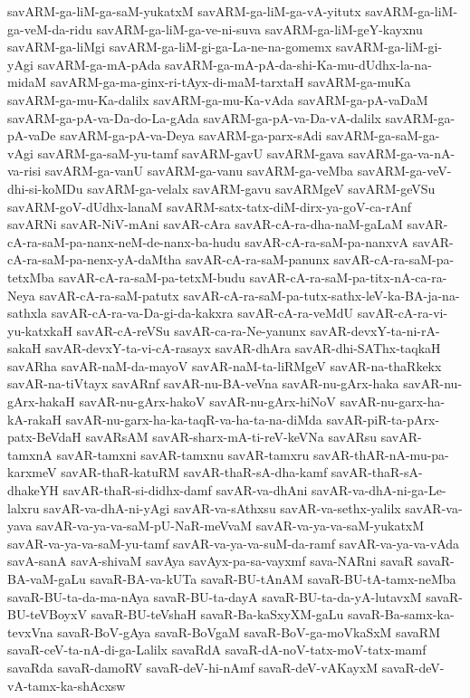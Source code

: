 {savARM-ga-liM-ga-saM-yukatxM
savARM-ga-liM-ga-vA-yitutx
savARM-ga-liM-ga-veM-da-ridu
savARM-ga-liM-ga-ve-ni-suva
savARM-ga-liM-geY-kayxnu
savARM-ga-liMgi
savARM-ga-liM-gi-ga-La-ne-na-gomemx
savARM-ga-liM-gi-yAgi
savARM-ga-mA-pAda
savARM-ga-mA-pA-da-shi-Ka-mu-dUdhx-la-na-midaM
savARM-ga-ma-ginx-ri-tAyx-di-maM-tarxtaH
savARM-ga-muKa
savARM-ga-mu-Ka-dalilx
savARM-ga-mu-Ka-vAda
savARM-ga-pA-vaDaM
savARM-ga-pA-va-Da-do-La-gAda
savARM-ga-pA-va-Da-vA-dalilx
savARM-ga-pA-vaDe
savARM-ga-pA-va-Deya
savARM-ga-parx-sAdi
savARM-ga-saM-ga-vAgi
savARM-ga-saM-yu-tamf
savARM-gavU
savARM-gava
savARM-ga-va-nA-va-risi
savARM-ga-vanU
savARM-ga-vanu
savARM-ga-veMba
savARM-ga-veV-dhi-si-koMDu
savARM-ga-velalx
savARM-gavu
savARMgeV
savARM-geVSu
savARM-goV-dUdhx-lanaM
savARM-satx-tatx-diM-dirx-ya-goV-ca-rAnf
savARNi
savAR-NiV-mAni
savAR-cAra
savAR-cA-ra-dha-naM-gaLaM
savAR-cA-ra-saM-pa-nanx-neM-de-nanx-ba-hudu
savAR-cA-ra-saM-pa-nanxvA
savAR-cA-ra-saM-pa-nenx-yA-daMtha
savAR-cA-ra-saM-panunx
savAR-cA-ra-saM-pa-tetxMba
savAR-cA-ra-saM-pa-tetxM-budu
savAR-cA-ra-saM-pa-titx-nA-ca-ra-Neya
savAR-cA-ra-saM-patutx
savAR-cA-ra-saM-pa-tutx-sathx-leV-ka-BA-ja-na-sathxla
savAR-cA-ra-va-Da-gi-da-kakxra
savAR-cA-ra-veMdU
savAR-cA-ra-vi-yu-katxkaH
savAR-cA-reVSu
savAR-ca-ra-Ne-yanunx
savAR-devxY-ta-ni-rA-sakaH
savAR-devxY-ta-vi-cA-rasayx
savAR-dhAra
savAR-dhi-SAThx-taqkaH
savARha
savAR-naM-da-mayoV
savAR-naM-ta-liRMgeV
savAR-na-thaRkekx
savAR-na-tiVtayx
savARnf
savAR-nu-BA-veVna
savAR-nu-gArx-haka
savAR-nu-gArx-hakaH
savAR-nu-gArx-hakoV
savAR-nu-gArx-hiNoV
savAR-nu-garx-ha-kA-rakaH
savAR-nu-garx-ha-ka-taqR-va-ha-ta-na-diMda
savAR-piR-ta-pArx-patx-BeVdaH
savARsAM
savAR-sharx-mA-ti-reV-keVNa
savARsu
savAR-tamxnA
savAR-tamxni
savAR-tamxnu
savAR-tamxru
savAR-thAR-nA-mu-pa-karxmeV
savAR-thaR-katuRM
savAR-thaR-sA-dha-kamf
savAR-thaR-sA-dhakeYH
savAR-thaR-si-didhx-damf
savAR-va-dhAni
savAR-va-dhA-ni-ga-Le-lalxru
savAR-va-dhA-ni-yAgi
savAR-va-sAthxsu
savAR-va-sethx-yalilx
savAR-va-yava
savAR-va-ya-va-saM-pU-NaR-meVvaM
savAR-va-ya-va-saM-yukatxM
savAR-va-ya-va-saM-yu-tamf
savAR-va-ya-va-suM-da-ramf
savAR-va-ya-va-vAda
savA-sanA
savA-shivaM
savAya
savAyx-pa-sa-vayxmf
sava-NARni
savaR
savaR-BA-vaM-gaLu
savaR-BA-va-kUTa
savaR-BU-tAnAM
savaR-BU-tA-tamx-neMba
savaR-BU-ta-da-ma-nAya
savaR-BU-ta-dayA
savaR-BU-ta-da-yA-lutavxM
savaR-BU-teVBoyxV
savaR-BU-teVshaH
savaR-Ba-kaSxyXM-gaLu
savaR-Ba-samx-ka-tevxVna
savaR-BoV-gAya
savaR-BoVgaM
savaR-BoV-ga-moVkaSxM
savaRM
savaR-ceV-ta-nA-di-ga-Lalilx
savaRdA
savaR-dA-noV-tatx-moV-tatx-mamf
savaRda
savaR-damoRV
savaR-deV-hi-nAmf
savaR-deV-vAKayxM
savaR-deV-vA-tamx-ka-shAcxsw
}
